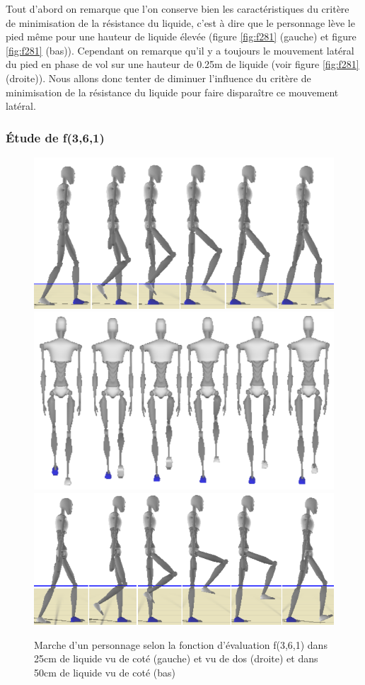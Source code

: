 \documentclass[runningheads,a4paper]{llncs}
\begin{document}
Tout d'abord on remarque que l'on conserve bien les caractéristiques du critère de minimisation de la résistance du liquide, c'est à dire que le personnage lève le pied même pour une hauteur de liquide élevée (figure \ref{fig:f281} (gauche) et figure \ref{fig:f281} (bas)). Cependant on remarque qu'il y a toujours le mouvement latéral du pied en phase de vol sur une hauteur de 0.25m de liquide (voir figure \ref{fig:f281} (droite)). Nous allons donc tenter de diminuer l'influence du critère de minimisation de la résistance du liquide pour faire disparaître ce mouvement latéral.

\subsubsection{Étude de f(3,6,1)}
\begin{figure}[h]
\centering
\includegraphics[scale=0.35]{strips/3_6_1_25cm.png}
\includegraphics[scale=0.35]{strips/3_6_1_25cm_from_back.png}
\includegraphics[scale=0.4]{strips/3_6_1_50cm.png}
\caption{Marche d'un personnage selon la fonction d'évaluation f(3,6,1) dans 25cm de liquide vu de coté (gauche) et vu de dos (droite) et dans 50cm de liquide vu de coté (bas)}
\label{fig:f361}
\end{figure}
\end{document}

